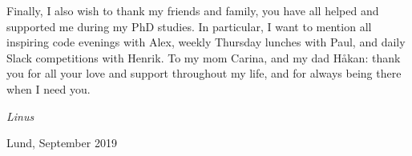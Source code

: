 Finally, I also wish to thank my friends and family, you have all helped and supported me during my PhD studies.
In particular, I want to mention all inspiring code evenings with Alex, weekly Thursday lunches with Paul, and daily Slack competitions with Henrik.
To my mom Carina, and my dad Håkan: thank you for all your love and support throughout my life, and for always being there when I need you.

\begin{flushright}
	\emph{Linus}
	
	Lund, September 2019
\end{flushright}
